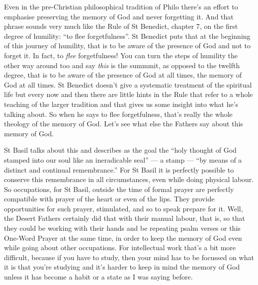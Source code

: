 Even in the pre-Christian philosophical tradition of Philo there's an effort to emphasise preserving the memory of God and never forgetting it. And that phrase sounds very much like the Rule of St Benedict, chapter 7, on the first degree of humility: ``to flee forgetfulness''. St Benedict puts that at the beginning of this journey of humility, that is to be aware of the presence of God and not to forget it. In fact, to \emph{flee} forgetfulness! You can turn the steps of humility the other way around too and say \emph{this} is the summmit, as opposed to the twelfth degree, that is to be aware of the presence of God at all times, the memory of God at all times. St Benedict doesn't give a systematic treatment of the spiritual life but every now and then there are little hints in the Rule that refer to a whole teaching of the larger tradition and that gives us some insight into what he's talking about. So when he says to flee forgetfulness, that's really the whole theology of the memory of God. Let's see what else the Fathers say about this memory of God.

St Basil talks about this and describes as the goal the ``holy thought of God stamped into our soul like an ineradicable seal'' --- a stamp --- ``by means of a distinct and continual remembrance.'' For St Basil it is perfectly possible to conserve this remembrance in all circumstances, even while doing physical labour. So occupations, for St Basil, outside the time of formal prayer are perfectly compatible with prayer of the heart or even of the lips. They provide opportunities for such prayer, stimulated, and so to speak prepare for it. Well, the Desert Fathers certainly did that with their manual labour, that is, so that they could be working with their hands and be repeating psalm verses or this One-Word Prayer at the same time, in order to keep the memory of God even while going about other occupations. For intellectual work that's a bit more difficult, because if you have to study, then your mind has to be focussed on what it is that you're studying and it's harder to keep in mind the memory of God unless it has become a habit or a state as I was saying before.

